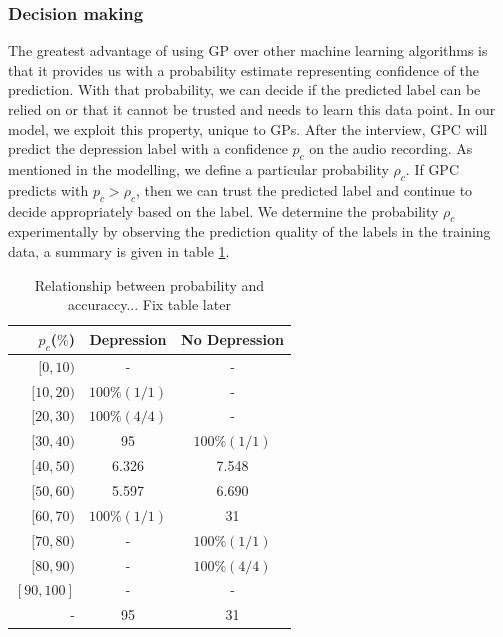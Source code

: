 \documentclass{article}
\begin{document}
	\subsubsection{Decision making}
	The greatest advantage of using GP over other machine learning algorithms is that it provides us with a probability estimate representing confidence of the prediction. With that probability, we can decide if the predicted label can be relied on or that it cannot be trusted and needs to learn this data point. In our model, we exploit this property, unique to GPs. After the interview, GPC will predict the depression label with a confidence $p_c$ on the audio recording. As mentioned in the modelling, we define a particular probability $\rho_c$. If GPC predicts with $p_c>\rho_c$, then we can trust the predicted label and continue to decide appropriately based on the label. We determine the probability $\rho_c$ experimentally by observing the prediction quality of the labels in the training data, a summary is given in table \ref{tab:rho}.
	
 	\begin{table}[h]
 		\begin{center}
  			\begin{tabular}{ | r | c | c | }
    			\hline
			 	 \bfseries $p_c$($\%$)	& \bfseries Depression 	& \bfseries No Depression \\ \hline
				 $[0,10)$		& - 			& - 			 \\ \hline
				 $[10,20)$		& $100\%(1/1)$ 		& -		 \\ \hline
				 $[20,30)$		& $100\%(4/4)$ 		& - 	 \\ \hline
				 $[30,40)$		& 95 			& $100\%(1/1)$ 			 \\ \hline
				 $[40,50)$		& 6.326 		& 7.548		 \\ \hline
				 $[50,60)$		& 5.597 		& 6.690 	 \\ \hline 
				 $[60,70)$		& $100\%(1/1)$ 			& 31 			 \\ \hline
				 $[70,80)$		& - 		& $100\%(1/1)$		 \\ \hline
				 $[80,90)$		& - 		& $100\%(4/4)$ 	 \\ \hline 
				 $[90,100]$		& - 			& - 			 \\ \hline
				 -		& 95 			& 31 			 \\ \hline
			 \end{tabular}
		\end{center}
 	\caption{Relationship between probability and accuraccy... Fix table later}
 	\label{tab:rho}
 	\end{table}
\end{document}
